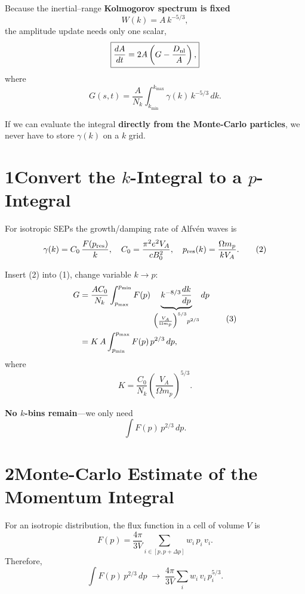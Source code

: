 Because the inertial–range \textbf{Kolmogorov spectrum is fixed}
\[
W(k) = A\,k^{-5/3},
\]
the amplitude update needs only one scalar,
\[
\boxed{ \displaystyle 
\frac{dA}{dt} = 2A\left( G - \frac{D_{\rm nl}}{A} \right),
}
\]
where
\begin{equation}
G(s,t) = \frac{A}{N_k} \int_{k_{\min}}^{k_{\max}} \gamma(k)\,k^{-5/3}\,dk.
\tag{1}
\end{equation}

If we can evaluate the integral \textbf{directly from the Monte-Carlo particles}, we never have to store $\gamma(k)$ on a $k$ grid.

\section*{1\quad Convert the $k$-Integral to a $p$-Integral}

For isotropic SEPs the growth/damping rate of Alfvén waves is
\begin{equation}
\gamma(k) = C_0\,\frac{F(p_{\rm res})}{k},
\quad
C_0 = \frac{\pi^{2}e^{2}V_A}{cB_0^{2}},
\quad
p_{\rm res}(k) = \frac{\Omega m_p}{kV_A}.
\tag{2}
\end{equation}

Insert (2) into (1), change variable $k \to p$:
\begin{equation}
\begin{aligned}
G &= \frac{AC_0}{N_k} \int_{p_{\max}}^{p_{\min}}
F(p)\, \underbrace{k^{-8/3} \frac{dk}{dp}}_{\Bigl( \frac{V_A}{\Omega m_p} \Bigr)^{5/3} p^{2/3}} dp \\
  &= K\,A \int_{p_{\min}}^{p_{\max}} F(p)\,p^{2/3}\,dp,
\end{aligned}
\tag{3}
\end{equation}
where
\begin{equation}
K = \frac{C_0}{N_k} \left( \frac{V_A}{\Omega m_p} \right)^{5/3}.
\tag{4}
\end{equation}

\textbf{No $k$-bins remain}---we only need
\[
\int F(p)\,p^{2/3}\,dp.
\]

\section*{2\quad Monte-Carlo Estimate of the Momentum Integral}

For an isotropic distribution, the flux function in a cell of volume $V$ is
\begin{equation}
F(p) = \frac{4\pi}{3V}
\sum_{i\in[p,p+\Delta p]} w_i\,p_i\,v_i.
\tag{5}
\end{equation}
Therefore,
\begin{equation}
\int F(p)\,p^{2/3}\,dp \;\longrightarrow\;
\frac{4\pi}{3V}\sum_i w_i\,v_i\,p_i^{5/3}.
\tag{6}
\end{equation}


